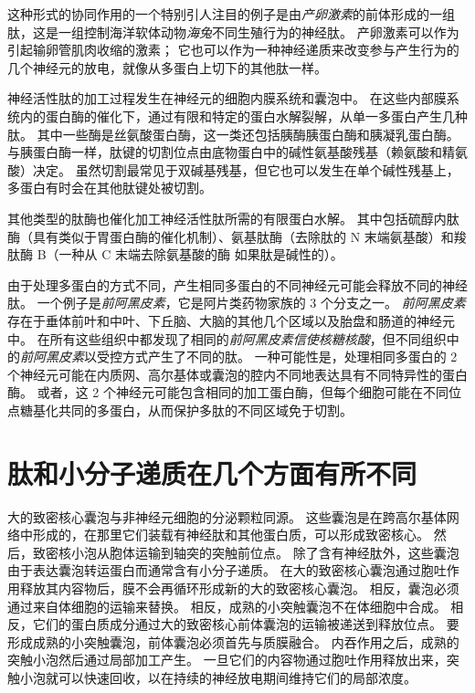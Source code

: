 这种形式的协同作用的一个特别引人注目的例子是由\textit{产卵激素}的前体形成的一组肽，这是一组控制海洋软体动物\textit{海兔}不同生殖行为的神经肽。
产卵激素可以作为引起输卵管肌肉收缩的激素；
它也可以作为一种神经递质来改变参与产生行为的几个神经元的放电，就像从多蛋白上切下的其他肽一样。


神经活性肽的加工过程发生在神经元的细胞内膜系统和囊泡中。
在这些内部膜系统内的蛋白酶的催化下，通过有限和特定的蛋白水解裂解，从单一多蛋白产生几种肽。
其中一些酶是丝氨酸蛋白酶，这一类还包括胰酶胰蛋白酶和胰凝乳蛋白酶。
与胰蛋白酶一样，肽键的切割位点由底物蛋白中的碱性氨基酸残基（赖氨酸和精氨酸）决定。
虽然切割最常见于双碱基残基，但它也可以发生在单个碱性残基上，多蛋白有时会在其他肽键处被切割。


其他类型的肽酶也催化加工神经活性肽所需的有限蛋白水解。
其中包括硫醇内肽酶（具有类似于胃蛋白酶的催化机制）、氨基肽酶（去除肽的 N 末端氨基酸）和羧肽酶 B（一种从 C 末端去除氨基酸的酶 如果肽是碱性的）。


由于处理多蛋白的方式不同，产生相同多蛋白的不同神经元可能会释放不同的神经肽。
一个例子是\textit{前阿黑皮素}，它是阿片类药物家族的 3 个分支之一。
\textit{前阿黑皮素}存在于垂体前叶和中叶、下丘脑、大脑的其他几个区域以及胎盘和肠道的神经元中。
在所有这些组织中都发现了相同的\textit{前阿黑皮素}\textit{信使核糖核酸}，但不同组织中的\textit{前阿黑皮素}以受控方式产生了不同的肽。
一种可能性是，处理相同多蛋白的 2 个神经元可能在内质网、高尔基体或囊泡的腔内不同地表达具有不同特异性的蛋白酶。
或者，这 2 个神经元可能包含相同的加工蛋白酶，但每个细胞可能在不同位点糖基化共同的多蛋白，从而保护多肽的不同区域免于切割。



\section{肽和小分子递质在几个方面有所不同}

大的致密核心囊泡与非神经元细胞的分泌颗粒同源。
这些囊泡是在跨高尔基体网络中形成的，在那里它们装载有神经肽和其他蛋白质，可以形成致密核心。
然后，致密核小泡从胞体运输到轴突的突触前位点。
除了含有神经肽外，这些囊泡由于表达囊泡转运蛋白而通常含有小分子递质。
在大的致密核心囊泡通过胞吐作用释放其内容物后，膜不会再循环形成新的大的致密核心囊泡。
相反，囊泡必须通过来自体细胞的运输来替换。
相反，成熟的小突触囊泡不在体细胞中合成。
相反，它们的蛋白质成分通过大的致密核心前体囊泡的运输被递送到释放位点。
要形成成熟的小突触囊泡，前体囊泡必须首先与质膜融合。
内吞作用之后，成熟的突触小泡然后通过局部加工产生。 
一旦它们的内容物通过胞吐作用释放出来，突触小泡就可以快速回收，以在持续的神经放电期间维持它们的局部浓度。


